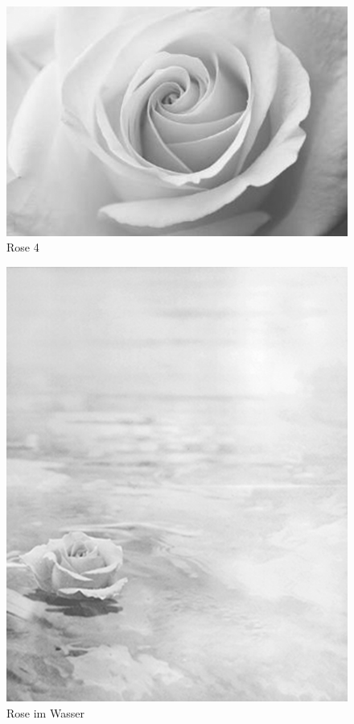 \documentclass[ngerman,a4paper,11pt]{scrreprt}
\begin{document}
\begin{figure}[H]
\centering
\includegraphics[width=\textwidth,height=.8\textheight]{Bilder/Bilder/750_0010_13971_Rose_im_Wald.png}
\caption{Rose 4}
\end{figure}

\begin{figure}[H]
\centering
\includegraphics[width=\textwidth,height=.8\textheight]{Bilder/Bilder/750_0010_12458_Seerose_test.png}
\caption{Rose im Wasser}
\end{figure}
\end{document}
